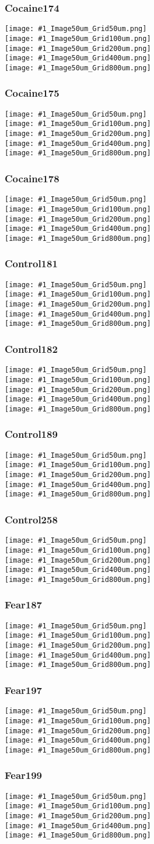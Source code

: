 \documentclass{beamer}
\newcommand{\dataframe}[1]
{
 \begin{frame}
  \frametitle{#1}
  \begin{center}
   \texttt{[image: \#1\_Image50um\_Grid50um.png]}\\
   \texttt{[image: \#1\_Image50um\_Grid100um.png]}\\
   \texttt{[image: \#1\_Image50um\_Grid200um.png]}\\
   \texttt{[image: \#1\_Image50um\_Grid400um.png]}\\
   \texttt{[image: \#1\_Image50um\_Grid800um.png]}\\
  \end{center}
 \end{frame}
}
\begin{document}
 \dataframe{Cocaine174}
 \dataframe{Cocaine175}
 \dataframe{Cocaine178}
 \dataframe{Control181}
 \dataframe{Control182}
 \dataframe{Control189}
 \dataframe{Control258}
 \dataframe{Fear187}
 \dataframe{Fear197}
 \dataframe{Fear199}
\end{document}
